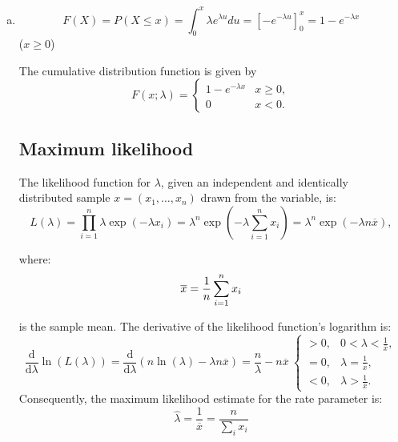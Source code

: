 \documentclass[a4paper,12pt]{article}
\begin{document}
\begin{enumerate}[(a)]
 \item 
 
\[
F(X) = P(X \leq x) = \int^{x}_{0} \lambda e^{\lambda u} du
 = [-e^{-\lambda u}]^{x}_{0}  = 1-e^{-\lambda x}\] ($x \geq  0$)

The cumulative distribution function is given by 
\[ {\displaystyle F(x;\lambda )={\begin{cases}1-e^{-\lambda x}&x\geq 0,\\0&x<0.\end{cases}}} \]


\newpage
\subsection*{Maximum likelihood}
The likelihood function for $\lambda$, given an independent and identically distributed sample $x = (x_1, \ldots, x_n)$ drawn from the variable, is: 
\[ {\displaystyle L(\lambda )=\prod _{i=1}^{n}\lambda \exp(-\lambda x_{i})=\lambda ^{n}\exp \left(-\lambda \sum _{i=1}^{n}x_{i}\right)=\lambda ^{n}\exp \left(-\lambda n{\overline {x}}\right),} \]

where: 
\[ {\displaystyle {\overline {x}}={1 \over n}\sum _{i=1}^{n}x_{i}} \]

is the sample mean. 
The derivative of the likelihood function's logarithm is: 
\[ {\displaystyle {\frac {\mathrm {d} }{\mathrm {d} \lambda }}\ln(L(\lambda ))={\frac {\mathrm {d} }{\mathrm {d} \lambda }}\left(n\ln(\lambda )-\lambda n{\overline {x}}\right)={\frac {n}{\lambda }}-n{\overline {x}}\ {\begin{cases}>0,&0<\lambda <{\frac {1}{\overline {x}}},\\[8pt]=0,&\lambda ={\frac {1}{\overline {x}}},\\[8pt]<0,&\lambda >{\frac {1}{\overline {x}}}.\end{cases}}} 
\]
Consequently, the maximum likelihood estimate for the rate parameter is: 
\[ {\displaystyle {\widehat {\lambda }}={\frac {1}{\overline {x}}}={\frac {n}{\sum _{i}x_{i}}}} \]


\end{enumerate}
\end{document}
